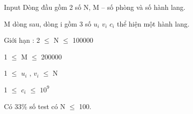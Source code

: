 Input
Dòng đầu gồm 2 số N, M – số phòng và số hành lang.   


   M dòng sau, dòng i gồm 3 số $u_{i}$   $v_{i}$   $c_{i}$   thể hiện một hành lang.   


Giới hạn :   2  $\le$  N  $\le$  100000   


   1  $\le$  M  $\le$  200000   


   1  $\le$  $u_{i}$   , $v_{i}$    $\le$  N   


   1  $\le$  $c_{i}$    $\le$  $10^{9}$

   Có 33\% số test có N  $\le$  100.
